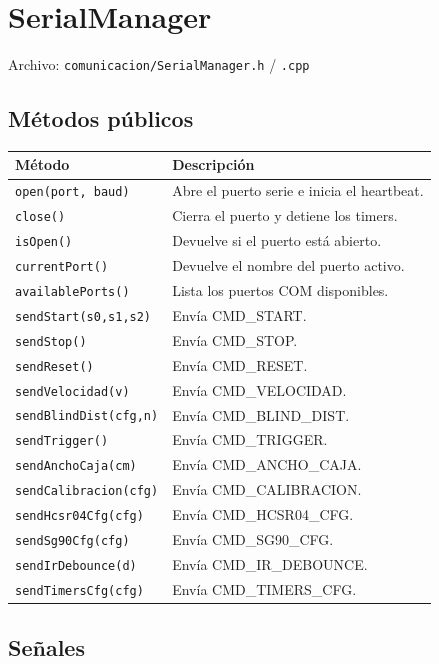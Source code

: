 \documentclass[12pt,a4paper]{report}
\newcommand{\file}[1]{\texttt{#1}}
\begin{document}
\section{SerialManager}

Archivo: \file{comunicacion/SerialManager.h} / \file{.cpp}

\subsection{Métodos públicos}

\begin{tabular}{lp{7.5cm}}
  \toprule
  \textbf{Método} & \textbf{Descripción} \\
  \midrule
  \texttt{open(port, baud)} & Abre el puerto serie e inicia el heartbeat. \\
  \texttt{close()} & Cierra el puerto y detiene los timers. \\
  \texttt{isOpen()} & Devuelve si el puerto está abierto. \\
  \texttt{currentPort()} & Devuelve el nombre del puerto activo. \\
  \texttt{availablePorts()} & Lista los puertos COM disponibles. \\
  \texttt{sendStart(s0,s1,s2)} & Envía CMD\_START. \\
  \texttt{sendStop()} & Envía CMD\_STOP. \\
  \texttt{sendReset()} & Envía CMD\_RESET. \\
  \texttt{sendVelocidad(v)} & Envía CMD\_VELOCIDAD. \\
  \texttt{sendBlindDist(cfg,n)} & Envía CMD\_BLIND\_DIST. \\
  \texttt{sendTrigger()} & Envía CMD\_TRIGGER. \\
  \texttt{sendAnchoCaja(cm)} & Envía CMD\_ANCHO\_CAJA. \\
  \texttt{sendCalibracion(cfg)} & Envía CMD\_CALIBRACION. \\
  \texttt{sendHcsr04Cfg(cfg)} & Envía CMD\_HCSR04\_CFG. \\
  \texttt{sendSg90Cfg(cfg)} & Envía CMD\_SG90\_CFG. \\
  \texttt{sendIrDebounce(d)} & Envía CMD\_IR\_DEBOUNCE. \\
  \texttt{sendTimersCfg(cfg)} & Envía CMD\_TIMERS\_CFG. \\
  \bottomrule
\end{tabular}

\subsection{Señales}
\end{document}
